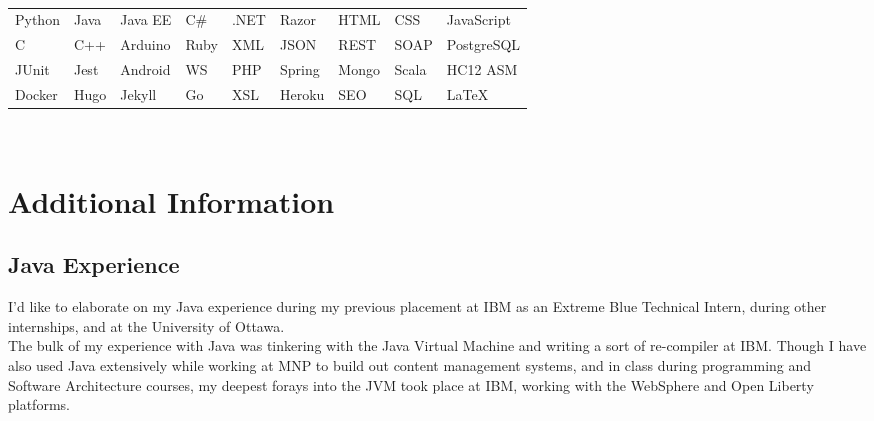 \documentclass[]{rcf_cv}
\begin{document}
	\textcolor[rgb]{0.99,0.99,0.99}{
	\scalebox{.001}{ %
	Address: 1205 - 180 Lees Ave Ottawa, Ontario K1S 5J6, 
	City: Ottawa, Province: Ontario ON,
	Name: Ryan Fleck,
	Email: Ryan.Fleck@protonmail.com,
	GitHub: RyanFleck, https://github.com/RyanFleck/
	Stack Overflow: https://stackoverflow.com/users/9899022/ryan-fleck
	Version Control: Git, Github, Microsoft TFS.
	Automated testing with python and selenium.			
	Innovative, Daring, Computer Science, Computer Engineering
	Experience programmer. Computer programmer, 
	Full-stack, 
	Mobile Phone: +1 (613) 501 4043
	Phone: 6135014043
	University: University of Ottawa, 
	Degree Type: Bachelor's Degree, 
	Major: Computer Engineering,	 
	Start: September 2015
	End: April 2021
	Concurrent Java programming.
	Asynchronous JavaScript programming.
	SCRUM, AGILE, technical innovator.			
	} %
	}\\
	\begin{tabular}{l l l l l l l l l}
		Python & Java & Java EE & C\# & .NET & Razor & HTML & CSS & JavaScript\\
		
		C & C++ & Arduino & Ruby & XML & JSON & REST & SOAP & PostgreSQL\\
		
		JUnit & Jest & Android & WS & PHP & Spring & Mongo & Scala &  HC12 ASM\\
		
		Docker & Hugo & Jekyll & Go & XSL & Heroku & SEO & SQL & \LaTeX
		
	\end{tabular} \\
	
	
	\section{Additional Information}
	
	\subsection{Java Experience}
	
	I'd like to elaborate on my Java experience during
	my previous placement at IBM as an Extreme Blue Technical Intern, during other internships, and at the University of Ottawa. \\
	
	The bulk of my experience with Java was tinkering with the Java Virtual Machine and writing
	a sort of re-compiler at IBM. Though I have also used Java extensively while working at MNP
	to build out content management systems, and in class during programming and Software Architecture
	courses, my deepest forays into the JVM took place at IBM, 
	working with the WebSphere and Open Liberty platforms. \\
	
\end{document}
